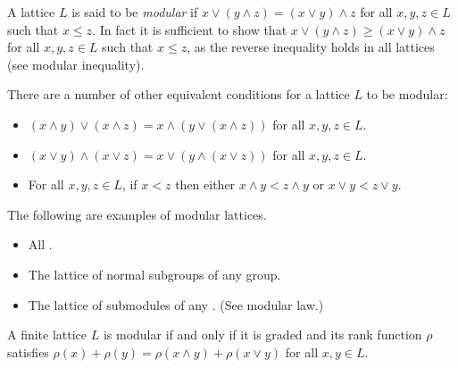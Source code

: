 \documentclass[12pt]{article}
\def\meet{\land}
\def\join{\lor}
\begin{document}

A lattice $L$ is said to be \emph{modular}
if $x \lor (y \land z) = (x \lor y) \land z$
for all $x,y,z\in L$ such that $x \leq z$.
In fact it is sufficient to show that
$x \lor (y \land z) \ge (x \lor y) \land z$
for all $x,y,z\in L$ such that $x \leq z$,
as the reverse inequality holds in all lattices (see modular inequality).

There are a number of other equivalent conditions for a lattice $L$ to be modular:
\begin{itemize}
\item $(x\meet y)\join(x\meet z)=x\meet(y\join(x\meet z))$
      for all $x,y,z\in L$.
\item $(x\join y)\meet(x\join z)=x\join(y\meet(x\join z))$
      for all $x,y,z\in L$.
\item For all $x,y,z\in L$,
      if $x<z$ then either $x\meet y<z\meet y$ or $x\join y<z\join y$.
\end{itemize}

The following are examples of modular lattices.
\begin{itemize}
\item All .
\item The lattice of normal subgroups of any group.
\item The lattice of submodules of any .
     (See modular law.)
\end{itemize}

A finite lattice $L$ is modular
if and only if it
is graded and its rank function $\rho$ satisfies
$\rho(x)+\rho(y)=\rho(x\land y)+\rho(x\lor y)$ for all $x,y\in L$.
\end{document}
